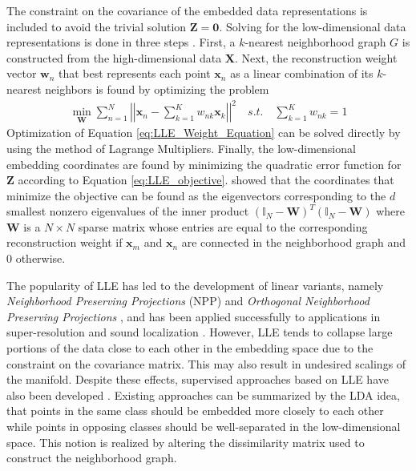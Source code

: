 \noindent
The constraint on the covariance of the embedded data representations is included to avoid the trivial solution $\bm{Z} = \bm{0}$.  Solving for the low-dimensional data representations is done in three steps \citep{Thorstensen2009ManifoldThesis}.  First, a $k$-nearest neighborhood graph $G$ is constructed from the high-dimensional data $\bm{X}$.  Next, the reconstruction weight vector $\bm{w}_{n}$ that best represents each point  $\bm{x}_{n}$ as a linear combination of its $k$-nearest neighbors is found by optimizing the problem
\begin{align} \label{eq:LLE_Weight_Equation}
	\min_{\bm{W}}\sum_{n=1}^{N} \left | \left | \bm{x}_{n} - \sum_{k=1}^{K}w_{nk}\bm{x}_{k} \right | \right |^{2} \quad s.t. \quad \sum_{k=1}^{K}w_{nk} =1
\end{align}
\noindent
Optimization of Equation \ref{eq:LLE_Weight_Equation} can be solved directly by using the method of Lagrange Multipliers. Finally, the low-dimensional embedding coordinates are found by minimizing the quadratic error function for $\bm{Z}$ according to Equation \ref{eq:LLE_objective}.  \cite{Roweis2000LLE} showed that the coordinates that minimize the objective can be found as the eigenvectors corresponding to the $d$ smallest nonzero eigenvalues of the inner product $(\bm{\mathbb{I}}_{N}-\bm{W})^{T}(\bm{\mathbb{I}}_{N}-\bm{W})$ where $\bm{W}$ is a $N \times N$ sparse matrix whose entries are equal to the corresponding reconstruction weight if $\bm{x}_{m}$ and $\bm{x}_{n}$ are connected in the neighborhood graph and $0$ otherwise.

The popularity of LLE has led to the development of linear variants, namely \textit{Neighborhood Preserving Projections} (NPP) \citep{Pang2005NPP} and \textit{Orthogonal Neighborhood Preserving Projections} \citep{Kokiopoulou2007OrthoNPP}, and has been applied successfully to applications in super-resolution and sound localization \citep{VanDerMaaten2009DRReview}.  However, LLE tends to collapse large portions of the data close to each other in the embedding space due to the constraint on the covariance matrix.  This may also result in undesired scalings of the manifold.  Despite these effects, supervised approaches based on LLE have also been developed \citep{Chao2019RecentAdvancesSupervisedDimRed,Li2009SupManifoldLearning}.  Existing approaches can be summarized by the LDA idea, that points in the same class should be embedded more closely to each other while points in opposing classes should be well-separated in the low-dimensional space.  This notion is realized by altering the dissimilarity matrix used to construct the neighborhood graph.     


